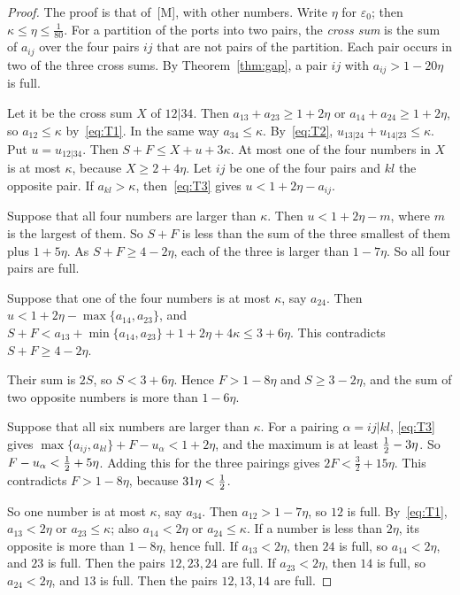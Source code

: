 \documentclass[11pt]{article}
\begin{document}
\begin{proof}
The proof is that of~[M], with other numbers. Write $\eta$ for $\varepsilon_0$; then
$\kappa\le\eta\le\frac1{80}$. For a partition of the ports into two pairs, the \emph{cross sum} is
the sum of $a_{ij}$ over the four pairs $ij$ that are not pairs of the partition. Each pair
occurs in two of the three cross sums. By Theorem~\ref{thm:gap}, a pair $ij$ with
$a_{ij}>1-20\eta$ is full.

 Let it be the cross sum $X$ of $12|34$. Then
$a_{13}+a_{23}\ge1+2\eta$ or $a_{14}+a_{24}\ge1+2\eta$, so $a_{12}\le\kappa$ by~\eqref{eq:T1}. In
the same way $a_{34}\le\kappa$. By~\eqref{eq:T2}, $u_{13|24}+u_{14|23}\le\kappa$. Put
$u=u_{12|34}$. Then $S+F\le X+u+3\kappa$. At most one of the four numbers in $X$ is at most
$\kappa$, because $X\ge2+4\eta$. Let $ij$ be one of the four pairs and $kl$ the opposite pair. If
$a_{kl}>\kappa$, then~\eqref{eq:T3} gives $u<1+2\eta-a_{ij}$.

Suppose that all four numbers are larger than $\kappa$. Then $u<1+2\eta-m$, where $m$ is the
largest of them. So $S+F$ is less than the sum of the three smallest of them plus $1+5\eta$. As
$S+F\ge4-2\eta$, each of the three is larger than $1-7\eta$. So all four pairs are full.

Suppose that one of the four numbers is at most $\kappa$, say $a_{24}$. Then
$u<1+2\eta-\max\{a_{14},a_{23}\}$, and
$S+F<a_{13}+\min\{a_{14},a_{23}\}+1+2\eta+4\kappa\le3+6\eta$. This contradicts $S+F\ge4-2\eta$.

 Their sum is $2S$, so $S<3+6\eta$. Hence
$F>1-8\eta$ and $S\ge3-2\eta$, and the sum of two opposite numbers is more than $1-6\eta$.

Suppose that all six numbers are larger than $\kappa$. For a pairing $\alpha=ij|kl$,
\eqref{eq:T3} gives $\max\{a_{ij},a_{kl}\}+F-u_\alpha<1+2\eta$, and the maximum is at least
$\tfrac12-3\eta$. So $F-u_\alpha<\tfrac12+5\eta$. Adding this for the three pairings gives
$2F<\frac32+15\eta$. This contradicts $F>1-8\eta$, because $31\eta<\tfrac12$.

So one number is at most $\kappa$, say $a_{34}$. Then $a_{12}>1-7\eta$, so $12$ is full.
By~\eqref{eq:T1}, $a_{13}<2\eta$ or $a_{23}\le\kappa$; also $a_{14}<2\eta$ or $a_{24}\le\kappa$.
If a number is less than $2\eta$, its opposite is more than $1-8\eta$, hence full. If
$a_{13}<2\eta$, then $24$ is full, so $a_{14}<2\eta$, and $23$ is full. Then the pairs
$12,23,24$ are full. If $a_{23}<2\eta$, then $14$ is full, so $a_{24}<2\eta$, and $13$ is full.
Then the pairs $12,13,14$ are full.
\end{proof}
\end{document}

